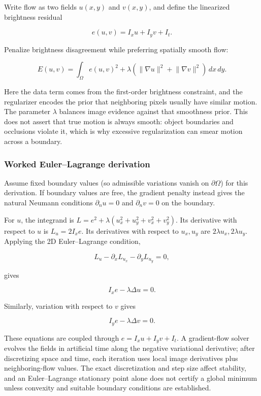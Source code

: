Write flow as two fields \(u(x,y)\) and \(v(x,y)\), and define the linearized brightness residual

\[
e(u,v)=I_xu+I_yv+I_t.
\]

Penalize brightness disagreement while preferring spatially smooth flow:

\[
E(u,v)=\int_\Omega e(u,v)^2+\lambda\left(\lVert\nabla u\rVert^2+\lVert\nabla v\rVert^2\right)\,dx\,dy.
\]

Here the data term comes from the first-order brightness constraint, and the regularizer encodes the prior that neighboring pixels usually have similar motion. The parameter \(\lambda\) balances image evidence against that smoothness prior. This does not assert that true motion is always smooth: object boundaries and occlusions violate it, which is why excessive regularization can smear motion across a boundary.

\subsubsection{Worked Euler--Lagrange derivation}\label{02-foundations-ii-ch036-worked-eulerlagrange-derivation}

Assume fixed boundary values (so admissible variations vanish on \(\partial\Omega\)) for this derivation. If boundary values are free, the gradient penalty instead gives the natural Neumann conditions \(\partial_n u=0\) and \(\partial_n v=0\) on the boundary.

For \(u\), the integrand is \(L=e^2+\lambda(u_x^2+u_y^2+v_x^2+v_y^2)\). Its derivative with respect to \(u\) is \(L_u=2I_x e\). Its derivatives with respect to \(u_x,u_y\) are \(2\lambda u_x,2\lambda u_y\). Applying the 2D Euler--Lagrange condition,

\[
L_u-\partial_x L_{u_x}-\partial_y L_{u_y}=0,
\]

gives

\[
I_x e-\lambda\Delta u=0.
\]

Similarly, variation with respect to \(v\) gives

\[
I_y e-\lambda\Delta v=0.
\]

These equations are coupled through \(e=I_xu+I_yv+I_t\). A gradient-flow solver evolves the fields in artificial time along the negative variational derivative; after discretizing space and time, each iteration uses local image derivatives plus neighboring-flow values. The exact discretization and step size affect stability, and an Euler--Lagrange stationary point alone does not certify a global minimum unless convexity and suitable boundary conditions are established.

